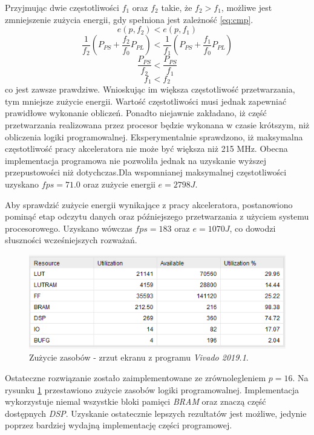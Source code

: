 Przyjmując dwie częstotliwości $f_1$ oraz $f_2$ takie, że $f_2 > f_1$, możliwe jest zmniejszenie zużycia energii, gdy spełniona jest zależność \eqref{eq:cmp}.
\begin{equation}
e(p, f_2) < e(p,f_1)
\label{eq:cmp}
\end{equation}
\begin{equation}
\frac{1}{f_2}(P_{PS} + \frac{f_2}{f_0} P_{PL}) < 
\frac{1}{f_1}(P_{PS} + \frac{f_1}{f_0} P_{PL})
\end{equation}
\begin{equation}
\frac{P_{PS}}{f_2} < 
\frac{P_{PS}}{f_1}
\end{equation}
\begin{equation}
f_1 < f_2
\end{equation}
co jest zawsze prawdziwe.
Wnioskując im większa częstotliwość przetwarzania, tym mniejsze zużycie energii.
Wartość częstotliwości musi jednak zapewniać prawidłowe wykonanie obliczeń.
Ponadto niejawnie zakładano, iż część przetwarzania realizowana przez procesor będzie wykonana w czasie krótszym, niż obliczenia logiki programowalnej.
Eksperymentalnie sprawdzono, iż maksymalna częstotliwość pracy akceleratora nie może być większa niż 215 MHz.
Obecna implementacja programowa nie pozwoliła jednak na uzyskanie wyższej przepustowości niż dotychczas.Dla wspomnianej maksymalnej częstotliwości uzyskano $fps = 71.0$ oraz zużycie energii $e = 2798 J$.

Aby sprawdzić zużycie energii wynikające z pracy akceleratora, postanowiono pominąć etap odczytu danych oraz późniejszego przetwarzania z użyciem systemu procesorowego.
Uzyskano wówczas $fps = 183 $ oraz $e = 1070 J$, co dowodzi słuszności wcześniejszych rozważań.
 
 
\begin{figure}
    \centering
    \includegraphics[width=0.9\linewidth]{images/zasoby.png}
    \caption{Zużycie zasobów - zrzut ekranu z programu \emph{Vivado 2019.1}.}
    \label{fig:resources}
\end{figure}
Ostateczne rozwiązanie zostało zaimplementowane ze zrównolegleniem $p = 16$.
Na rysunku \ref{fig:resources} przestawiono zużycie zasobów logiki programowalnej.
Implementacja wykorzystuje niemal wszystkie bloki pamięci \emph{BRAM} oraz znaczą część dostępnych \emph{DSP}.
Uzyskanie ostatecznie lepszych rezultatów jest możliwe, jedynie poprzez bardziej wydajną implementację części programowej.



